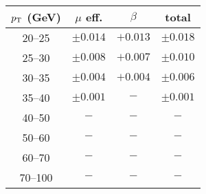 \begin{tabular}{c|cc|c}
$p_\text{T}$ (GeV)  & $\mu$ eff. & $\beta$ & total \\
\hline
20--25 & $\pm0.014$ & $+0.013$ & $\pm0.018$\\
25--30 & $\pm0.008$ & $+0.007$ & $\pm0.010$\\
30--35 & $\pm0.004$ & $+0.004$ & $\pm0.006$\\
35--40 & $\pm0.001$ & $-$ & $\pm0.001$\\
40--50 & $-$ & $-$ & $-$\\
50--60 & $-$ & $-$ & $-$\\
60--70 & $-$ & $-$ & $-$\\
70--100 & $-$ & $-$ & $-$\\
\end{tabular}
